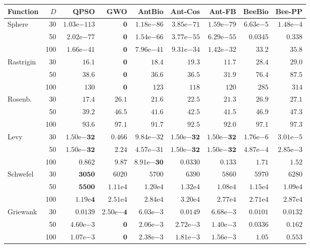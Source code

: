 \begin{tabular}{lrrrrrrrr}
\toprule
Function & $D$ & QPSO & GWO & AntBio & Ant-Cos & Ant-FB & BeeBio & Bee-PP \\
\midrule
Sphere & 30 & $1.03\mathrm{e}{-113}$ & $\mathbf{0}$ & $1.18\mathrm{e}{-86}$ & $3.85\mathrm{e}{-71}$ & $1.59\mathrm{e}{-79}$ & $6.63\mathrm{e}{-5}$ & $1.48\mathrm{e}{-4}$ \\
 & 50 & $2.02\mathrm{e}{-77}$ & $\mathbf{0}$ & $1.54\mathrm{e}{-66}$ & $3.77\mathrm{e}{-55}$ & $6.29\mathrm{e}{-55}$ & $0.0345$ & $0.338$ \\
 & 100 & $1.66\mathrm{e}{-41}$ & $\mathbf{0}$ & $7.96\mathrm{e}{-41}$ & $9.31\mathrm{e}{-34}$ & $1.42\mathrm{e}{-32}$ & $33.2$ & $35.8$ \\
\midrule
Rastrigin & 30 & $16.1$ & $\mathbf{0}$ & $18.4$ & $19.3$ & $11.7$ & $28.4$ & $29.0$ \\
 & 50 & $38.6$ & $\mathbf{0}$ & $36.6$ & $36.5$ & $31.9$ & $76.4$ & $87.5$ \\
 & 100 & $130$ & $\mathbf{0}$ & $123$ & $118$ & $120$ & $285$ & $314$ \\
\midrule
Rosenb. & 30 & $\mathbf{17.4}$ & $26.1$ & $21.6$ & $22.5$ & $21.3$ & $26.9$ & $27.1$ \\
 & 50 & $\mathbf{39.2}$ & $46.5$ & $41.6$ & $42.5$ & $41.5$ & $46.9$ & $47.3$ \\
 & 100 & $93.6$ & $97.1$ & $\mathbf{91.7}$ & $92.5$ & $92.0$ & $97.1$ & $97.3$ \\
\midrule
Levy & 30 & $\mathbf{1.50\mathrm{e}{-32}}$ & $0.466$ & $9.84\mathrm{e}{-32}$ & $\mathbf{1.50\mathrm{e}{-32}}$ & $\mathbf{1.50\mathrm{e}{-32}}$ & $1.76\mathrm{e}{-6}$ & $3.01\mathrm{e}{-5}$ \\
 & 50 & $\mathbf{1.50\mathrm{e}{-32}}$ & $2.24$ & $4.57\mathrm{e}{-31}$ & $\mathbf{1.50\mathrm{e}{-32}}$ & $\mathbf{1.50\mathrm{e}{-32}}$ & $4.87\mathrm{e}{-4}$ & $2.85\mathrm{e}{-3}$ \\
 & 100 & $0.862$ & $9.87$ & $\mathbf{8.91\mathrm{e}{-30}}$ & $0.0330$ & $0.133$ & $1.71$ & $1.52$ \\
\midrule
Schwefel & 30 & $\mathbf{3050}$ & $6020$ & $5700$ & $6390$ & $5860$ & $5970$ & $6280$ \\
 & 50 & $\mathbf{5500}$ & $1.11\mathrm{e}{4}$ & $1.20\mathrm{e}{4}$ & $1.32\mathrm{e}{4}$ & $1.08\mathrm{e}{4}$ & $1.15\mathrm{e}{4}$ & $1.09\mathrm{e}{4}$ \\
 & 100 & $\mathbf{1.19\mathrm{e}{4}}$ & $2.51\mathrm{e}{4}$ & $2.84\mathrm{e}{4}$ & $3.20\mathrm{e}{4}$ & $2.77\mathrm{e}{4}$ & $2.71\mathrm{e}{4}$ & $2.87\mathrm{e}{4}$ \\
\midrule
Griewank & 30 & $0.0139$ & $\mathbf{2.50\mathrm{e}{-4}}$ & $6.03\mathrm{e}{-3}$ & $0.0149$ & $6.68\mathrm{e}{-3}$ & $0.0101$ & $0.0132$ \\
 & 50 & $4.60\mathrm{e}{-3}$ & $\mathbf{0}$ & $2.06\mathrm{e}{-3}$ & $2.72\mathrm{e}{-3}$ & $1.40\mathrm{e}{-3}$ & $0.0336$ & $0.162$ \\
 & 100 & $1.07\mathrm{e}{-3}$ & $\mathbf{0}$ & $2.38\mathrm{e}{-3}$ & $1.81\mathrm{e}{-3}$ & $1.56\mathrm{e}{-3}$ & $1.05$ & $0.553$ \\
\bottomrule
\end{tabular}

